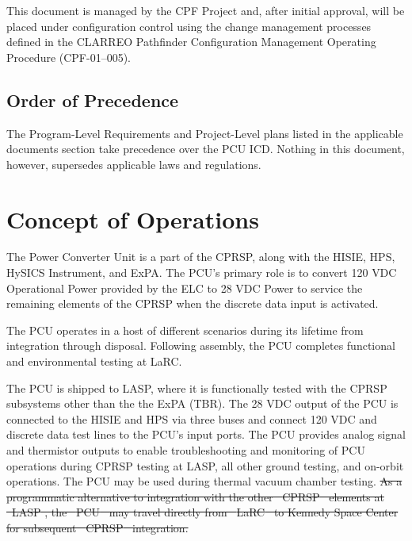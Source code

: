 \documentclass[12pt,oneside,oldfontcommands]{memoir}
\providecommand{\DIFdeltex}[1]{{\protect\color{red}\sout{#1}}}                      %
\providecommand{\DIFdelbegin}{} %
\providecommand{\DIFdelend}{} %
\providecommand{\DIFdel}[1]{\texorpdfstring{\DIFdeltex{#1}}{}} %
\newcommand{\DIFscaledelfig}{0.5}
\newlength{\DIFdelgraphicswidth} %
\newlength{\DIFdelgraphicsheight} %
\newcommand{\DIFdelincludegraphics}[2][]{%
\sbox{\DIFdelgraphicsbox}{\DIFOincludegraphics[#1]{#2}}%
\settoboxwidth{\DIFdelgraphicswidth}{\DIFdelgraphicsbox} %
\settoboxtotalheight{\DIFdelgraphicsheight}{\DIFdelgraphicsbox} %
\scalebox{\DIFscaledelfig}{%
\parbox[b]{\DIFdelgraphicswidth}{\usebox{\DIFdelgraphicsbox}\\[-\baselineskip] \rule{\DIFdelgraphicswidth}{0em}}\llap{\resizebox{\DIFdelgraphicswidth}{\DIFdelgraphicsheight}{%
\setlength{\unitlength}{\DIFdelgraphicswidth}%
\begin{picture}(1,1)%
\thicklines\linethickness{2pt} %
{\color[rgb]{1,0,0}\put(0,0){\framebox(1,1){}}}%
{\color[rgb]{1,0,0}\put(0,0){\line( 1,1){1}}}%
{\color[rgb]{1,0,0}\put(0,1){\line(1,-1){1}}}%
\end{picture}%
}\hspace*{3pt}}} %
} %
\DeclareRobustCommand{\DIFdelbegin}{\DIFOdelbegin \let\includegraphics\DIFdelincludegraphics} %
\DeclareRobustCommand{\DIFdelend}{\DIFOaddend \let\includegraphics\DIFOincludegraphics} %
\begin{document}
This document is managed by the \gls{CPF} Project and, after initial approval, will be placed under configuration control using the change management processes defined in the \gls{CLARREO} Pathfinder Configuration Management Operating Procedure (CPF-01--005).

\section{Order of Precedence }
\label{orderofprecedence}

The Program-Level Requirements and Project-Level plans listed in the applicable documents section take precedence over the \gls{PCU} \gls{ICD}. Nothing in this document, however, supersedes applicable laws and regulations.

\chapter{Concept of Operations  }
\label{conops}

The Power Converter Unit is a part of the \gls{CPRSP}, along with the \gls{HISIE}, \gls{HPS}, \gls{HySICS} Instrument, and \gls{ExPA}. The \gls{PCU}'s primary role is to convert 120 \gls{VDC} Operational Power provided by the \gls{ELC} to 28 \gls{VDC} Power to service the remaining elements of the \gls{CPRSP} when the discrete data input is activated.

The \gls{PCU} operates in a host of different scenarios during its lifetime from integration through disposal. Following assembly, the \gls{PCU} completes functional and environmental testing at \gls{LaRC}.

The \gls{PCU} is shipped to \gls{LASP}, where it is functionally tested with the \gls{CPRSP} subsystems other than the the \gls{ExPA} (TBR\label{tbx_1}). The 28 \gls{VDC} output of the \gls{PCU} is connected to the \gls{HISIE} and \gls{HPS} via three buses and connect 120 \gls{VDC} and discrete data test lines to the \gls{PCU}'s input ports. The \gls{PCU} provides analog signal and thermistor outputs to enable troubleshooting and monitoring of \gls{PCU} operations during \gls{CPRSP} testing at \gls{LASP}, all other ground testing, and on-orbit operations. The \gls{PCU} may be used during thermal vacuum chamber testing.
\DIFdelbegin \DIFdel{As a programmatic alternative to integration with the other \mbox{%
\gls{CPRSP} }\hspace{0pt}%
elements at \mbox{%
\gls{LASP}}\hspace{0pt}%
, the \mbox{%
\gls{PCU} }\hspace{0pt}%
may travel directly from \mbox{%
\gls{LaRC} }\hspace{0pt}%
to Kennedy Space Center for subsequent \mbox{%
\gls{CPRSP} }\hspace{0pt}%
integration.
}\DIFdelend 
\end{document}
